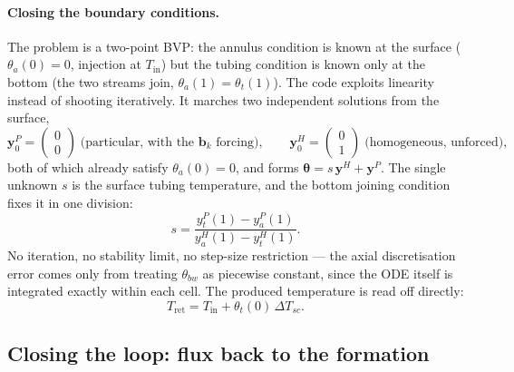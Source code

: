 \paragraph{Closing the boundary conditions.}
The problem is a two-point BVP: the annulus condition is known at the surface
($\theta_a(0)=0$, injection at $T_{\mathrm{in}}$) but the tubing condition is
known only at the bottom (the two streams join, $\theta_a(1)=\theta_t(1)$). The
code exploits linearity instead of shooting iteratively. It marches two
independent solutions from the surface,
\begin{equation}
\mathbf{y}^{P}_0=\begin{pmatrix}0\\
0\end{pmatrix} \;\text{(particular, with the }\mathbf{b}_k\text{ forcing)}, \qquad
\mathbf{y}^{H}_0=\begin{pmatrix}0\\
1\end{pmatrix} \;\text{(homogeneous, unforced)},
\label{eq:dbhe:seeds}
\end{equation}
both of which already satisfy $\theta_a(0)=0$, and forms
$\boldsymbol{\theta}=s\,\mathbf{y}^{H}+\mathbf{y}^{P}$. The single unknown $s$
is the surface tubing temperature, and the bottom joining condition fixes it in
one division:
\begin{equation}
s=\frac{y^{P}_{t}(1)-y^{P}_{a}(1)}{y^{H}_{a}(1)-y^{H}_{t}(1)} .
\label{eq:dbhe:shoot}
\end{equation}
No iteration, no stability limit, no step-size restriction --- the axial
discretisation error comes only from treating $\theta_{bw}$ as piecewise
constant, since the ODE itself is integrated exactly within each cell. The
produced temperature is read off directly:
\begin{equation}
T_{\mathrm{ret}}=T_{\mathrm{in}}+\theta_t(0)\,\Delta T_{sc}.
\label{eq:dbhe:Tret}
\end{equation}

\subsection{Closing the loop: flux back to the formation}
\label{sec:dbhe:coupling}


